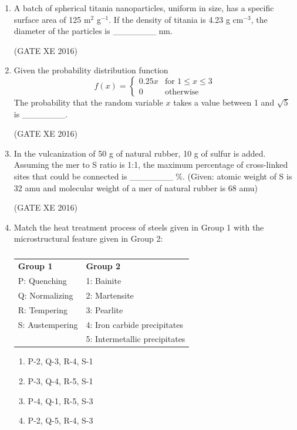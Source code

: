 \documentclass[12pt]{article}
\begin{document}
\begin{enumerate}
(Given: $erf(0.5) \approxeq 0.5$)  

(GATE XE 2016)

\item A batch of spherical titania nanoparticles, uniform in size, has a specific surface area of 125 m$^2$ g$^{-1}$. If the density of titania is 4.23 g cm$^{-3}$, the diameter of the particles is \_\_\_\_\_\_\_ nm.  

(GATE XE 2016)

\item Given the probability distribution function  
$$
f(x) = 
\begin{cases}
0.25x & \text{for } 1 \leq x \leq 3 \\
0 & \text{otherwise}
\end{cases}
$$
The probability that the random variable $x$ takes a value between 1 and $\sqrt{5}$ is \_\_\_\_\_\_\_.  

(GATE XE 2016)

\item In the vulcanization of 50 g of natural rubber, 10 g of sulfur is added. Assuming the mer to S ratio is 1:1, the maximum percentage of cross-linked sites that could be connected is \_\_\_\_\_\_\_ \%.  
(Given: atomic weight of S is 32 amu and molecular weight of a mer of natural rubber is 68 amu)  

(GATE XE 2016)

\item Match the heat treatment process of steels given in Group 1 with the microstructural feature given in Group 2:  

\begin{table}[H]
\centering
\caption{}
\label{}
\begin{tabular}{l l}
\textbf{Group 1} & \textbf{Group 2} \\
P: Quenching     & 1: Bainite \\
Q: Normalizing   & 2: Martensite \\
R: Tempering     & 3: Pearlite \\
S: Austempering  & 4: Iron carbide precipitates \\
                 & 5: Intermetallic precipitates \\
\end{tabular}
\end{table}

\begin{multicols}{2}
\begin{enumerate}
\item  P-2, Q-3, R-4, S-1 
\item  P-3, Q-4, R-5, S-1 
\item P-4, Q-1, R-5, S-3 
\item P-2, Q-5, R-4, S-3  
\end{enumerate}
\end{multicols}


\end{enumerate}
\end{document}
